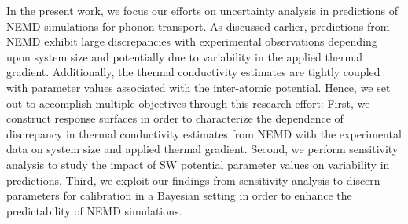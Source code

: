 In the present work, we focus our efforts on uncertainty analysis in predictions of NEMD simulations
for phonon transport.  As discussed earlier, predictions from NEMD
exhibit large discrepancies with experimental observations depending upon system size and potentially
due to variability in the applied thermal gradient. Additionally, the thermal conductivity estimates are
tightly coupled with parameter values associated with the inter-atomic potential. Hence, we set out to
accomplish multiple objectives through this research effort: First, we construct response surfaces
in order to characterize the dependence of discrepancy in thermal conductivity estimates from NEMD
with the experimental data on system size and applied thermal gradient. Second, we perform
sensitivity analysis to study the impact of SW potential parameter values on variability in predictions.
Third, we exploit our findings from sensitivity analysis to discern parameters for calibration in a Bayesian
setting in order to enhance the predictability of NEMD simulations. 